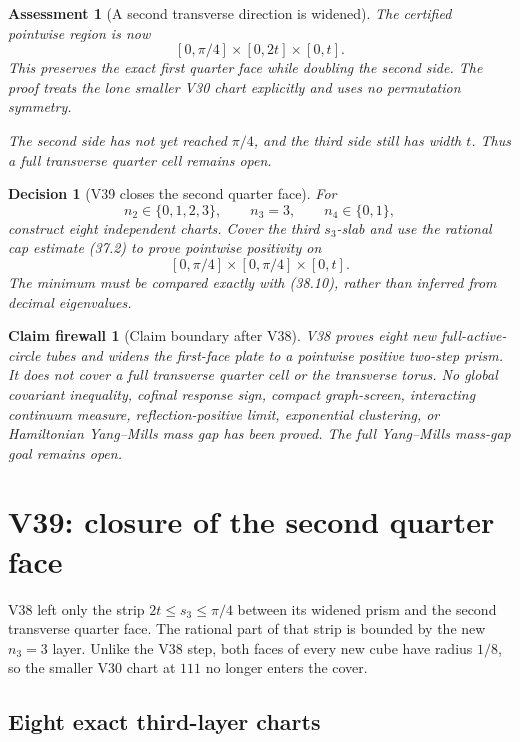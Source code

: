 \documentclass[11pt,oneside]{article}
\newtheorem{assessment}[theorem]{Assessment}
\newtheorem{firewall}[theorem]{Claim firewall}
\newtheorem{decision}[theorem]{Decision}
\theoremstyle{definition}
\theoremstyle{remark}
\begin{document}
\begin{assessment}[A second transverse direction is widened]
\label{ass:newv38}
The certified pointwise region is now
\[
 [0,\pi/4]\times[0,2t]\times[0,t].
\]
This preserves the exact first quarter face while doubling the
second side.  The proof treats the lone smaller V30 chart explicitly
and uses no permutation symmetry.

The second side has not yet reached \(\pi/4\), and the third side
still has width \(t\).  Thus a full transverse quarter cell remains
open.
\end{assessment}

\begin{decision}[V39 closes the second quarter face]
\label{dec:newv38-next}
For
\[
 n_2\in\{0,1,2,3\},\qquad n_3=3,\qquad n_4\in\{0,1\}, \tag{38.17}
\]
construct eight independent charts.  Cover the third
\(s_3\)-slab and use the rational cap estimate (37.2) to prove
pointwise positivity on
\[
 [0,\pi/4]\times[0,\pi/4]\times[0,t].
\]
The minimum must be compared exactly with (38.10), rather than
inferred from decimal eigenvalues.
\end{decision}

\begin{firewall}[Claim boundary after V38]
\label{fire:newv38-final}
V38 proves eight new full-active-circle tubes and widens the
first-face plate to a pointwise positive two-step prism.  It does
not cover a full transverse quarter cell or the transverse torus.
No global covariant inequality, cofinal response sign, compact
graph-screen, interacting continuum measure, reflection-positive
limit, exponential clustering, or Hamiltonian Yang--Mills mass gap
has been proved.  The full Yang--Mills mass-gap goal remains open.
\end{firewall}

\section{V39: closure of the second quarter face}
\label{sec:newv39-second-quarter-face}

V38 left only the strip \(2t\le s_3\le\pi/4\) between its widened
prism and the second transverse quarter face.  The rational part of
that strip is bounded by the new \(n_3=3\) layer.  Unlike the V38
step, both faces of every new cube have radius \(1/8\), so the
smaller V30 chart at \(111\) no longer enters the cover.

\subsection{Eight exact third-layer charts}
\end{document}
